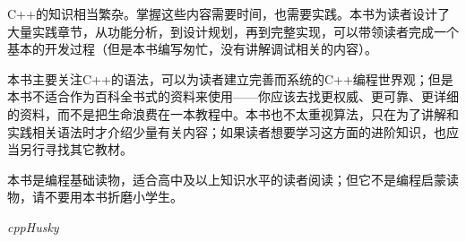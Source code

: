 C++的知识相当繁杂。掌握这些内容需要时间，也需要实践。本书为读者设计了大量实践章节，从功能分析，到设计规划，再到完整实现，可以带领读者完成一个基本的开发过程（但是本书编写匆忙，没有讲解调试相关的内容）。\par
本书主要关注C++的语法，可以为读者建立完善而系统的C++编程世界观；但是本书不适合作为百科全书式的资料来使用——你应该去找更权威、更可靠、更详细的资料，而不是把生命浪费在一本教程中。本书也不太重视算法，只在为了讲解和实践相关语法时才介绍少量有关内容；如果读者想要学习这方面的进阶知识，也应当另行寻找其它教材。\par
本书是编程基础读物，适合高中及以上知识水平的读者阅读；但它不是编程启蒙读物，请不要用本书折磨小学生。\par
\begin{flushright}
\textit{cppHusky}\par
\end{flushright}